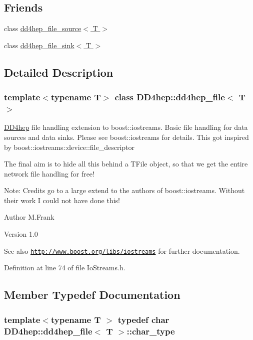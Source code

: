 \subsection*{Friends}
\begin{DoxyCompactItemize}
\item 
class \hyperlink{class_d_d4hep_1_1dd4hep__file_a6b3fcc7f94c708f7b47316d1ac4b1cf4}{dd4hep\_\-file\_\-source$<$ T $>$}
\item 
class \hyperlink{class_d_d4hep_1_1dd4hep__file_a0fff7b3c8e8c9c913c387a26c6829a36}{dd4hep\_\-file\_\-sink$<$ T $>$}
\end{DoxyCompactItemize}


\subsection{Detailed Description}
\subsubsection*{template$<$typename T$>$ class DD4hep::dd4hep\_\-file$<$ T $>$}

\hyperlink{namespace_d_d4hep}{DD4hep} file handling extension to boost::iostreams. Basic file handling for data sources and data sinks. Please see boost::iostreams for details. This got inspired by boost::iostreams::device::file\_\-descriptor

The final aim is to hide all this behind a TFile object, so that we get the entire network file handling for free!

Note: Credits go to a large extend to the authors of boost::iostreams. Without their work I could not have done this!

\begin{DoxyAuthor}{Author}
M.Frank 
\end{DoxyAuthor}
\begin{DoxyVersion}{Version}
1.0
\end{DoxyVersion}
\begin{DoxySeeAlso}{See also}
\href{http://www.boost.org/libs/iostreams}{\tt http://www.boost.org/libs/iostreams} for further documentation. 
\end{DoxySeeAlso}


Definition at line 74 of file IoStreams.h.

\subsection{Member Typedef Documentation}
\hypertarget{class_d_d4hep_1_1dd4hep__file_aef4242f7f2fe15a59f7bf7a8f6ba24d5}{
\subsubsection[{char\_\-type}]{\setlength{\rightskip}{0pt plus 5cm}template$<$typename T $>$ typedef char {\bf DD4hep::dd4hep\_\-file}$<$ {\bf T} $>$::{\bf char\_\-type}}}
\label{class_d_d4hep_1_1dd4hep__file_aef4242f7f2fe15a59f7bf7a8f6ba24d5}


